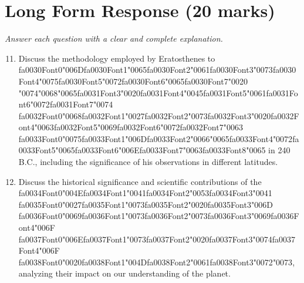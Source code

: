\documentclass[12pt]{article}
\begin{document}
\begin{enumerate}[label=\arabic*.]
\end{enumerate}

\section*{Long Form Response (20 marks)}
\textit{Answer each question with a clear and complete explanation.}
\begin{enumerate}[label=\arabic*.]
\setcounter{enumi}{10}
\item Discuss the methodology employed by Eratosthenes to {\csname fa0030Font0\endcsname\char"006D}{\csname fa0030Font1\endcsname\char"0065}{\csname fa0030Font2\endcsname\char"0061}{\csname fa0030Font3\endcsname\char"0073}{\csname fa0030Font4\endcsname\char"0075}{\csname fa0030Font5\endcsname\char"0072}{\csname fa0030Font6\endcsname\char"0065}{\csname fa0030Font7\endcsname\char"0020} {\char"0074}{\char"0068}{\char"0065}{\csname fa0031Font3\endcsname\char"0020}{\csname fa0031Font4\endcsname\char"0045}{\csname fa0031Font5\endcsname\char"0061}{\csname fa0031Font6\endcsname\char"0072}{\csname fa0031Font7\endcsname\char"0074} {\csname fa0032Font0\endcsname\char"0068}{\csname fa0032Font1\endcsname\char"0027}{\csname fa0032Font2\endcsname\char"0073}{\csname fa0032Font3\endcsname\char"0020}{\csname fa0032Font4\endcsname\char"0063}{\csname fa0032Font5\endcsname\char"0069}{\csname fa0032Font6\endcsname\char"0072}{\csname fa0032Font7\endcsname\char"0063} {\csname fa0033Font0\endcsname\char"0075}{\csname fa0033Font1\endcsname\char"006D}{\csname fa0033Font2\endcsname\char"0066}{\char"0065}{\csname fa0033Font4\endcsname\char"0072}{\csname fa0033Font5\endcsname\char"0065}{\csname fa0033Font6\endcsname\char"006E}{\csname fa0033Font7\endcsname\char"0063}{\csname fa0033Font8\endcsname\char"0065} in 240 B.C.,
including the significance of his observations in different latitudes.
\item Discuss the historical significance and scientific contributions of the {\csname fa0034Font0\endcsname\char"004E}{\csname fa0034Font1\endcsname\char"0041}{\csname fa0034Font2\endcsname\char"0053}{\csname fa0034Font3\endcsname\char"0041} {\csname fa0035Font0\endcsname\char"0027}{\csname fa0035Font1\endcsname\char"0073}{\csname fa0035Font2\endcsname\char"0020}{\csname fa0035Font3\endcsname\char"006D}
{\csname fa0036Font0\endcsname\char"0069}{\csname fa0036Font1\endcsname\char"0073}{\csname fa0036Font2\endcsname\char"0073}{\csname fa0036Font3\endcsname\char"0069}{\csname fa0036Font4\endcsname\char"006F} {\csname fa0037Font0\endcsname\char"006E}{\csname fa0037Font1\endcsname\char"0073}{\csname fa0037Font2\endcsname\char"0020}{\csname fa0037Font3\endcsname\char"0074}{\csname fa0037Font4\endcsname\char"006F} {\csname fa0038Font0\endcsname\char"0020}{\csname fa0038Font1\endcsname\char"004D}{\csname fa0038Font2\endcsname\char"0061}{\csname fa0038Font3\endcsname\char"0072}{\char"0073}, analyzing their impact on our understanding of the planet.
\end{enumerate}
\end{document}
